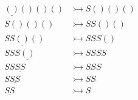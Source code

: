 \documentclass{article}
\begin{document}
\subsection{}
\begin{align*}
\underline{()}()()() &\rightarrowtail S()()() \\
S\underline{()}()() &\rightarrowtail SS()() \\
SS\underline{()}() &\rightarrowtail SSS() \\
SSS\underline{()} &\rightarrowtail SSSS \\
SS\underline{SS} &\rightarrowtail SSS \\
S\underline{SS} &\rightarrowtail SS \\
\underline{SS} &\rightarrowtail S
\end{align*}
\end{document}
